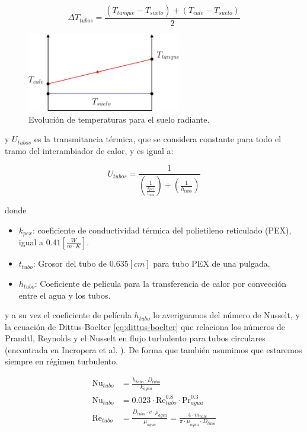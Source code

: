 \begin{equation} \label{eq:mean_delta_T}
	\Delta T_{tubos} = \frac{(T_{tanque} - T_{suelo}) + (T_{cale} - T_{suelo})}{2}
\end{equation}

\begin{figure}[h] \centering
	\centering
	\includegraphics[width=0.6\textwidth]{./capitulos/resultados_discusion/images/floor_temperatures.png}
	\caption{Evolución de temperaturas para el suelo radiante.}
	\label{fig:floor_temperatures}
\end{figure}

y $U_{tubos}$ es la transmitancia térmica, que se considera constante para todo
el tramo del interambiador de calor, y es igual a:

\begin{equation}
	U_{tubos} = \frac{1}{\left( \frac{1}{\frac{k_{pex}}{t_{tubo}}} \right) + \left( \frac{1}{h_{tubo}} \right)}
\end{equation}

donde

\begin{itemize}
	\item $k_{pex}$: coeficiente de conductividad térmica del polietileno reticulado (PEX), igual a $0.41\left[ \frac{W}{m \cdot K} \right]$.
	\item $t_{tubo}$: Grosor del tubo de $0.635[cm]$ para tubo PEX de una pulgada.
	\item $h_{tubo}$: Coeficiente de pelicula para la transferencia de calor por convección entre el agua y los tubos.
\end{itemize}

y a su vez el coeficiente de película $h_{tubo}$ lo averiguamos del número de
Nusselt, y la ecuación de Dittus-Boelter \eqref{eq:dittus-boelter} que
relaciona los números de Prandtl, Reynolds y el Nusselt en flujo turbulento
para tubos circulares (encontrada en Incropera et al.
\cite{incropera1996fundamentals}). De forma que también asumimos que estaremos
siempre en régimen turbulento.

\begin{align}
	\text{Nu}_{tubo} & = \frac{h_{tubo} \cdot D_{tubo}}{k_{agua}}                                                                                   \\
	\text{Nu}_{tubo} & = 0.023 \cdot \text{Re}_{tubo}^{0.8} \cdot \text{Pr}_{agua}^{0.3}     \label{eq:dittus-boelter}                              \\
	\text{Re}_{tubo} & = \frac{D_{tubo} \cdot v \cdot \rho_{agua}}{\mu_{agua}} = \frac{4 \cdot \dot{m}_{cale}}{\pi \cdot \mu_{agua} \cdot D_{tubo}}
\end{align}

